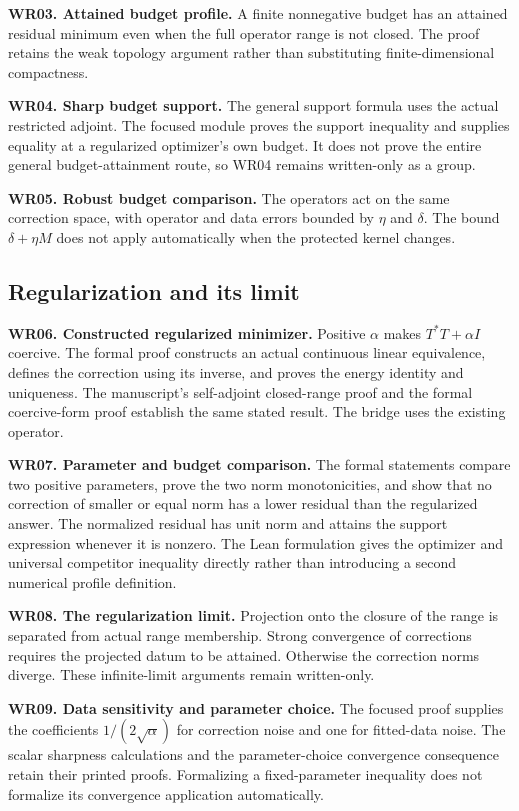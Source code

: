 \textbf{WR03. Attained budget profile.} A finite nonnegative budget has an attained residual minimum even when the full operator range is not closed. The proof retains the weak topology argument rather than substituting finite-dimensional compactness.

\textbf{WR04. Sharp budget support.} The general support formula uses the actual restricted adjoint. The focused module proves the support inequality and supplies equality at a regularized optimizer's own budget. It does not prove the entire general budget-attainment route, so WR04 remains written-only as a group.

\textbf{WR05. Robust budget comparison.} The operators act on the same correction space, with operator and data errors bounded by $\eta$ and $\delta$. The bound $\delta+\eta M$ does not apply automatically when the protected kernel changes.

\subsection{Regularization and its limit}
\textbf{WR06. Constructed regularized minimizer.} Positive $\alpha$ makes $T^*T+\alpha I$ coercive. The formal proof constructs an actual continuous linear equivalence, defines the correction using its inverse, and proves the energy identity and uniqueness. The manuscript's self-adjoint closed-range proof and the formal coercive-form proof establish the same stated result. The bridge uses the existing  operator.

\textbf{WR07. Parameter and budget comparison.} The formal statements compare two positive parameters, prove the two norm monotonicities, and show that no correction of smaller or equal norm has a lower residual than the regularized answer. The normalized residual has unit norm and attains the support expression whenever it is nonzero. The Lean formulation gives the optimizer and universal competitor inequality directly rather than introducing a second numerical profile definition.

\textbf{WR08. The regularization limit.} Projection onto the closure of the range is separated from actual range membership. Strong convergence of corrections requires the projected datum to be attained. Otherwise the correction norms diverge. These infinite-limit arguments remain written-only.

\textbf{WR09. Data sensitivity and parameter choice.} The focused proof supplies the coefficients $1/(2\sqrt\alpha)$ for correction noise and one for fitted-data noise. The scalar sharpness calculations and the parameter-choice convergence consequence retain their printed proofs. Formalizing a fixed-parameter inequality does not formalize its convergence application automatically.

